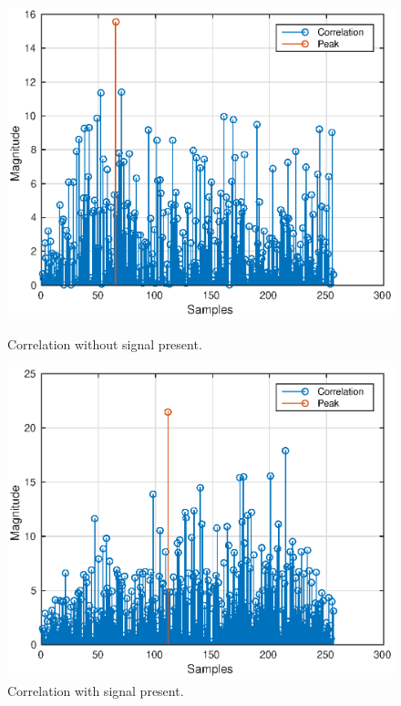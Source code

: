 \documentclass[letterpaper,12pt]{article}
\begin{document}
\begin{figure}
\centering
\begin{minipage}{.5\textwidth}
  \centering
  \includegraphics[width=1.0\linewidth]{fake_peak.eps}
  \caption{Correlation without signal present.}
  \label{fig:fake}
\end{minipage}%
\begin{minipage}{.5\textwidth}
  \centering
  \includegraphics[width=1.0\linewidth]{true_peak.eps}
  \caption{Correlation with signal present.}
  \label{fig:real}
\end{minipage}
\end{figure}
\end{document}
